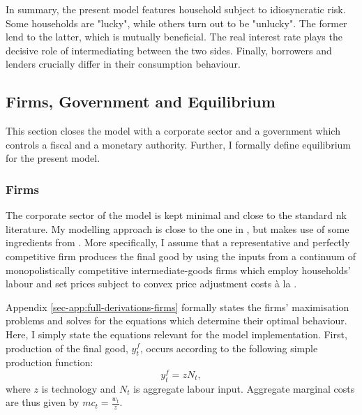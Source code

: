 \documentclass[12pt]{article} %
\numberwithin{equation}{section} %
\numberwithin{figure}{section}
\numberwithin{table}{section}
\begin{document}
In summary, the present model features household subject to idiosyncratic risk. Some households are "lucky", while others turn out to be "unlucky". The former lend to the latter, which is mutually beneficial. The real interest rate plays the decisive role of intermediating between the two sides. Finally, borrowers and lenders crucially differ in their consumption behaviour.


\subsection{Firms, Government and Equilibrium}
\label{sec:model-sectors}

This section closes the model with a corporate sector and a government which controls a fiscal and a monetary authority. Further, I formally define equilibrium for the present model.

\subsubsection{Firms}
\label{sec:model-firms}

The corporate sector of the model is kept minimal and close to the standard \Gls{nk} literature. My modelling approach is close to the one in \textcite{mckay2016}, but makes use of some ingredients from \textcite{gust2017wp}. More specifically, I assume that a representative and perfectly competitive firm produces the final good by using the inputs from a continuum of monopolistically competitive intermediate-goods firms which employ households' labour and set prices subject to convex price adjustment costs à la \textcite{rotemberg1982}. 

Appendix \ref{sec-app:full-derivations-firms} formally states the firms' maximisation problems and solves for the equations which determine their optimal behaviour. Here, I simply state the equations relevant for the model implementation. First, production of the final good, $y_t^f$, occurs according to the following simple production function:
\begin{equation}
    y_t^f = z N_t, \label{eq:firms-production}
\end{equation}
where $z$ is technology and $N_t$ is aggregate labour input. Aggregate marginal costs are thus given by $mc_t = \frac{w_t}{z}$. 
\end{document}
